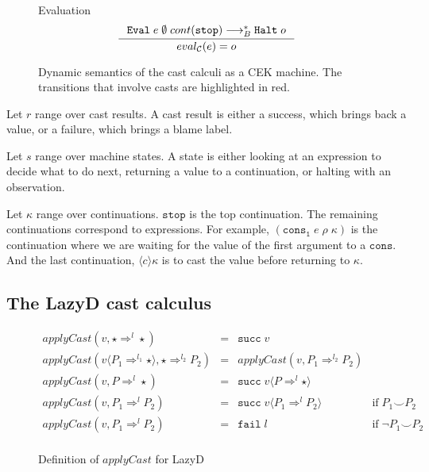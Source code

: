 \documentclass[acmsmall,review,anonymous]{acmart}\settopmatter{printfolios=true,printccs=false,printacmref=false}
\newcommand{\funrule}[3]{#1 &=& #2 & #3\\}
\newcommand{\lazyD}{Lazy\;D}
\newcommand{\sOOinspect}[3]{\mathtt{Eval} \; #1 \; #2 \; #3}
\newcommand{\sOOhalt}[1]{\mathtt{Halt} \; #1}
\newcommand{\cOOcast}[3]{#1 \Rightarrow^{#2} #3}
\newcommand{\vOOcast}[2]{#1\langle#2\rangle}
\newcommand{\rOOsucc}[1]{\mathtt{succ}\;#1}
\newcommand{\rOOfail}[1]{\mathtt{fail}\;#1}
\newcommand{\hckOOmt}[0]{\mathtt{stop}}
\newcommand{\sidecond}[1]{\text{if}\;#1}
\newcommand{\judgeCeval}[2]{eval_{\mathcal{C}}(#1) = #2}
\begin{document}
\begin{figure}
	Evaluation \fbox{$\judgeCeval{e}{o}$}
	\[
	\inference{
		\sOOinspect{e}{\emptyset}{cont(\hckOOmt)} \longrightarrow_{B}^{*} 
		\sOOhalt{o}
	}{
		\judgeCeval{e}{o}
	}
	\]
	
	\caption{Dynamic semantics of the cast calculi as a CEK
          machine. The transitions that involve casts are highlighted
          in red.}
	\label{fig:machine-cekc}
\end{figure}


Let $ r $ range over cast results. A cast result is either a success, which 
brings back a value, or a failure, which brings a blame label.

Let $ s $ range over machine states. A state is either looking at an 
expression to decide what to do next, returning a value to a continuation, or 
halting with an observation.

Let $ \kappa $ range over continuations. $ \mathtt{stop} $ is the top 
continuation. The remaining continuations correspond to expressions. For 
example, $ (\mathtt{cons_1} \; e \; \rho \; \kappa) $ is the continuation where 
we are waiting for the value of the first argument to a $ \mathtt{cons} $. And 
the last continuation, $ \langle c \rangle \kappa $ is to cast the value before 
returning to $ \kappa $.


\subsection{The \lazyD{} cast calculus}

\begin{figure}
	
	\[
	\begin{array}{rclr}
	\funrule{
		applyCast(v,\cOOcast{\star}{l}{\star})
	}{
		\rOOsucc{v}
	}{}
	\funrule{
		applyCast(\vOOcast{v}{\cOOcast{P_1}{l_1}{\star}},\cOOcast{\star}{l_2}{P_2})
	}{
		applyCast(v,\cOOcast{P_1}{l_2}{P_2})
	}{}
	\funrule{
		applyCast(v,\cOOcast{P}{l}{\star})
	}{
		\rOOsucc{\vOOcast{v}{\cOOcast{P}{l}{\star}}}
	}{}
	\funrule{
		applyCast(v,\cOOcast{P_1}{l}{P_2})
	}{
		\rOOsucc{\vOOcast{v}{\cOOcast{P_1}{l}{P_2}}}
	}{\sidecond{P_1 \smile P_2}}
	\funrule{
		applyCast(v,\cOOcast{P_1}{l}{P_2})
	}{
		\rOOfail{l}
	}{\sidecond{\neg P_1 \smile P_2}}
	
	\end{array}
	\]
	\caption{Definition of $ applyCast $ for \lazyD}
	\label{fig:applyCast-D-C}
\end{figure}
\end{document}
